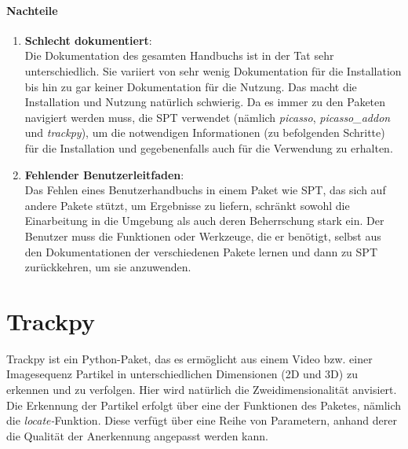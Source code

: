 	\paragraph{Nachteile}
		\begin{enumerate}
    			\item \textbf{Schlecht dokumentiert}:\\
				Die Dokumentation des gesamten Handbuchs ist in der Tat sehr unterschiedlich. Sie variiert von sehr wenig Dokumentation für die Installation bis hin zu gar keiner Dokumentation für die Nutzung.  Das macht die Installation und Nutzung natürlich schwierig. Da es immer zu den Paketen navigiert werden muss, die SPT verwendet (nämlich \textit{picasso}, \textit{picasso\_addon} und \textit{trackpy}), um die notwendigen Informationen (zu befolgenden Schritte) für die Installation und gegebenenfalls auch für die Verwendung zu erhalten.
				
    			\item \textbf{Fehlender Benutzerleitfaden}:\\
				Das Fehlen eines Benutzerhandbuchs in einem Paket wie SPT, das sich auf andere Pakete stützt, um Ergebnisse zu liefern, schränkt sowohl die Einarbeitung in die Umgebung als auch deren Beherrschung stark ein. Der Benutzer muss die Funktionen oder Werkzeuge, die er benötigt, selbst aus den Dokumentationen der verschiedenen Pakete lernen und dann zu SPT zurückkehren, um sie anzuwenden.
				
    			
		\end{enumerate}



\section{Trackpy \label{kap1_trackpy}}
Trackpy ist ein Python-Paket, das es ermöglicht aus einem Video bzw. einer Imagesequenz Partikel in unterschiedlichen Dimensionen (2D und 3D) zu erkennen und zu verfolgen. Hier wird natürlich die Zweidimensionalität anvisiert. Die Erkennung der Partikel erfolgt über eine der Funktionen des Paketes, nämlich die \textit{locate-}Funktion.
Diese verfügt über eine Reihe von Parametern, anhand derer die Qualität der Anerkennung angepasst werden kann.

